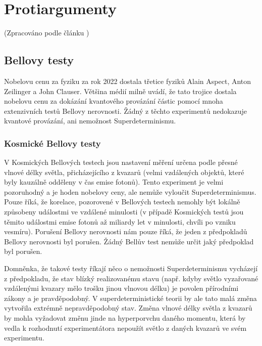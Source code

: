 \section{Protiargumenty}
(Zpracováno podle článku \cite{supdet:rethink})
\subsection{Bellovy testy}


Nobelovu cenu za fyziku za rok 2022 dostala třetice fyziků Alain Aspect, Anton Zeilinger a John Clauser. Většina médií milně uvádí, že tato trojice dostala nobelovu cenu za dokázání kvantového provázání částic pomocí mnoha extenzivních testů Bellovy nerovnosti. Žádný z těchto experimentů nedokazuje kvantové provázání, ani nemožnost Superdeterminismu.

\subsubsection{Kosmické Bellovy testy}
V Kosmických Bellových testech \parencite{CosBTest:1}\parencite{CosBTest:2} jsou nastavení měření určena podle přesné vlnové délky světla, přicházejícího z kvazarů (velmi vzdálených objektů, které byly kauzálně odděleny v čas emise fotonů). Tento experiment je velmi pozoruhodný a je hoden nobelovy ceny, ale nemůže vyloučit Superdeterminismus. Pouze říká, že korelace, pozorovené v Bellových testech nemohly být lokálně způsobeny událostmi ve vzdálené minulosti (v případě Kosmických testů jsou těmito událostmi emise fotonů až miliardy let v minulosti, chvíli po vzniku vesmíru). Porušení Bellovy nerovnosti nám pouze říká, že jeden z předpokladů Bellovy nerovnosti byl porušen. Žádný Bellův test nemůže určit jaký předpoklad byl porušen.

Domněnka, že takové testy říkají něco o nemožnosti Superdeterminismu vycházejí z předpokladu, že stav blízký realizovanému stavu (např. kdyby světlo vyzařované vzdálenými kvazary mělo trošku jinou vlnovou délku) je povolen přírodními zákony a je pravděpodobný. V superdeterministické teorii by ale tato malá změna vytvořila extrémně nepravděpodobný stav. Změna vlnové délky světla z kvazarů by mohla vyžadovat změnu jinde na hyperporvchu daného momentu, která by vedla k rozhodnutí experimentátora nepoužít světlo z daných kvazarů ve svém experimentu.
\clearpage

